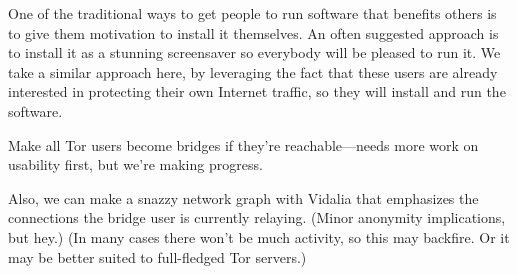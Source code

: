 \documentclass{llncs}
\begin{document}
One of the traditional ways to get people to run software that benefits
others is to give them motivation to install it themselves.  An often
suggested approach is to install it as a stunning screensaver so everybody
will be pleased to run it. We take a similar approach here, by leveraging
the fact that these users are already interested in protecting their
own Internet traffic, so they will install and run the software.

Make all Tor users become bridges if they're reachable---needs more work
on usability first, but we're making progress.

Also, we can make a snazzy network graph with Vidalia that emphasizes
the connections the bridge user is currently relaying. (Minor anonymity
implications, but hey.) (In many cases there won't be much activity,
so this may backfire. Or it may be better suited to full-fledged Tor
servers.)







\end{document}
